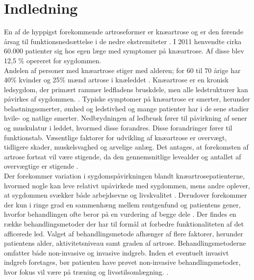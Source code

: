 \section{Indledning} \label{indledning}
En af de hyppigst forekommende artroseformer er knæartrose og er den førende årsag til funktionsnedsættelse i de nedre ekstremiteter \citep{Beswick2012}. I 2011 henvendte cirka 60.000 patienter sig hos egen læge med symptomer på knæartrose. Af disse blev 12,5 \% opereret for sygdommen. \citep{brostrom2012} \\
Andelen af personer med knæartrose stiger med alderen; for 60 til 70 årige har 40\% kvinder og 25\% mænd artrose i knæleddet \citep{schroder}. Knæartrose er en kronisk ledsygdom, der primært rammer ledfladens bruskdele, men alle ledstrukturer kan påvirkes af sygdommen. \citep{schroder}. Typiske symptomer på knæartrose er smerter, herunder belastningssmerter,  ømhed og ledstivhed og mange patienter har i de sene stadier hvile- og natlige smerter. Nedbrydningen af ledbrusk fører til påvirkning af sener og muskulatur i leddet, hvormed disse forandres. Disse forandringer fører til funktionstab. Væsentlige faktorer for udvikling af knæartrose er overvægt, tidligere skader, muskelsvaghed og arvelige anlæg. Det antages, at forekomsten af artrose fortsat vil være stigende, da den gennemsnitlige levealder og antallet af overvægtige er stigende \citep{sygdom}.\\
Der forekommer variation i sygdomspåvirkningen blandt knæartrosepatienterne, hvormed nogle kan leve relativt upåvirkede med sygdommen, mens andre oplever, at sygdommen svækker både arbejdsevne og livskvalitet \citep{sygdom}. Derudover forekommer der kun i ringe grad en sammenhæng mellem røntgenfund og patientens gener, hvorfor behandlingen ofte beror på en vurdering af begge dele \citep{ugeskrift2011}. Der findes en række behandlingsmetoder der har til formål at forbedre funktionaliteten af det afficerede led. Valget af behandlingsmetode afhænger af flere faktorer, herunder patientens alder, aktivitetsniveau samt graden af artrose. Behandlingsmetoderne omfatter både non-invasive og invasive indgreb. Inden et eventuelt invasivt indgreb foretages, bør patienten have prøvet non-invasive behandlingsmetoder, hvor fokus vil være på træning og livsstilsomlægning. \citep{schroder}.
